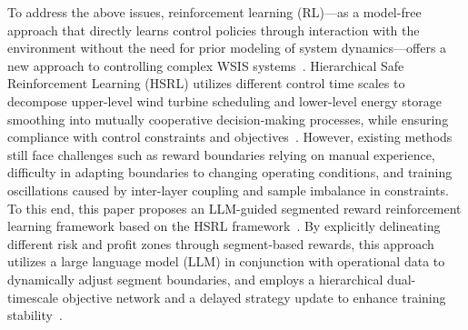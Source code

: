 \documentclass[lettersize,journal]{IEEEtran}
\begin{document}
To address the above issues, reinforcement learning (RL)---as a model-free approach that directly learns control policies through interaction with the environment without the need for prior modeling of system dynamics---offers a new approach to controlling complex WSIS systems~\cite{ref7,ref13}. Hierarchical Safe Reinforcement Learning (HSRL) utilizes different control time scales to decompose upper-level wind turbine scheduling and lower-level energy storage smoothing into mutually cooperative decision-making processes, while ensuring compliance with control constraints and objectives~\cite{ref14}. However, existing methods still face challenges such as reward boundaries relying on manual experience, difficulty in adapting boundaries to changing operating conditions, and training oscillations caused by inter-layer coupling and sample imbalance in constraints. To this end, this paper proposes an LLM-guided segmented reward reinforcement learning framework based on the HSRL framework~\cite{ref14}. By explicitly delineating different risk and profit zones through segment-based rewards, this approach utilizes a large language model (LLM) in conjunction with operational data to dynamically adjust segment boundaries, and employs a hierarchical dual-timescale objective network and a delayed strategy update to enhance training stability~\cite{ref15,ref16}.
\end{document}
